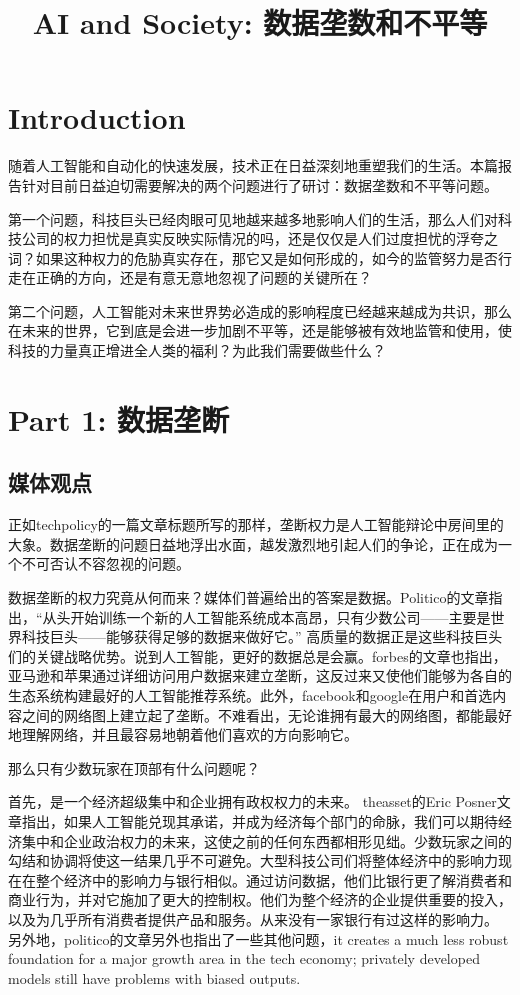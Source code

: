 \documentclass[11pt]{article}
\title{AI and Society: 数据垄数和不平等}
\begin{document}
\maketitle

\section{Introduction}

随着人工智能和自动化的快速发展，技术正在日益深刻地重塑我们的生活。本篇报告针对目前日益迫切需要解决的两个问题进行了研讨：数据垄数和不平等问题。

第一个问题，科技巨头已经肉眼可见地越来越多地影响人们的生活，那么人们对科技公司的权力担忧是真实反映实际情况的吗，还是仅仅是人们过度担忧的浮夸之词？如果这种权力的危胁真实存在，那它又是如何形成的，如今的监管努力是否行走在正确的方向，还是有意无意地忽视了问题的关键所在？

第二个问题，人工智能对未来世界势必造成的影响程度已经越来越成为共识，那么在未来的世界，它到底是会进一步加剧不平等，还是能够被有效地监管和使用，使科技的力量真正增进全人类的福利？为此我们需要做些什么？

\section{Part 1: 数据垄断}

\subsection{媒体观点}

正如techpolicy的一篇文章标题所写的那样，垄断权力是人工智能辩论中房间里的大象。数据垄断的问题日益地浮出水面，越发激烈地引起人们的争论，正在成为一个不可否认不容忽视的问题。

数据垄断的权力究竟从何而来？媒体们普遍给出的答案是数据。Politico的文章指出，“从头开始训练一个新的人工智能系统成本高昂，只有少数公司——主要是世界科技巨头——能够获得足够的数据来做好它。” 高质量的数据正是这些科技巨头们的关键战略优势。说到人工智能，更好的数据总是会赢。forbes的文章也指出，亚马逊和苹果通过详细访问用户数据来建立垄断，这反过来又使他们能够为各自的生态系统构建最好的人工智能推荐系统。此外，facebook和google在用户和首选内容之间的网络图上建立起了垄断。不难看出，无论谁拥有最大的网络图，都能最好地理解网络，并且最容易地朝着他们喜欢的方向影响它。

那么只有少数玩家在顶部有什么问题呢？

首先，是一个经济超级集中和企业拥有政权权力的未来。
theasset的Eric Posner文章指出，如果人工智能兑现其承诺，并成为经济每个部门的命脉，我们可以期待经济集中和企业政治权力的未来，这使之前的任何东西都相形见绌。少数玩家之间的勾结和协调将使这一结果几乎不可避免。大型科技公司们将整体经济中的影响力现在在整个经济中的影响力与银行相似。通过访问数据，他们比银行更了解消费者和商业行为，并对它施加了更大的控制权。他们为整个经济的企业提供重要的投入，以及为几乎所有消费者提供产品和服务。从来没有一家银行有过这样的影响力。
另外地，politico的文章另外也指出了一些其他问题，it creates a much less robust foundation for a major growth area in the tech economy; privately developed models still have problems with biased outputs. 
\end{document}
